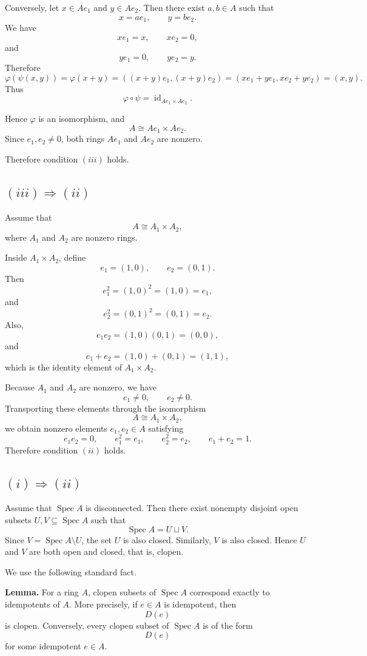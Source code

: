 \documentclass[12pt,a4paper]{article}
\newcommand{\Spec}{\operatorname{Spec}}
\begin{document}
	Conversely, let \(x\in Ae_1\) and \(y\in Ae_2\). Then there exist \(a,b\in A\)
	such that
	\[
	x=ae_1,
	\qquad
	y=be_2.
	\]
	We have
	\[
	xe_1=x,
	\qquad
	xe_2=0,
	\]
	and
	\[
	ye_1=0,
	\qquad
	ye_2=y.
	\]
	Therefore
	\[
	\varphi(\psi(x,y))
	=
	\varphi(x+y)
	=
	((x+y)e_1,(x+y)e_2)
	=
	(xe_1+ye_1,xe_2+ye_2)
	=
	(x,y).
	\]
	Thus
	\[
	\varphi\circ\psi=\operatorname{id}_{Ae_1\times Ae_2}.
	\]
	
	Hence \(\varphi\) is an isomorphism, and
	\[
	A\cong Ae_1\times Ae_2.
	\]
	Since \(e_1,e_2\neq 0\), both rings \(Ae_1\) and \(Ae_2\) are nonzero.
	
	Therefore condition \((iii)\) holds.
	
	\subsection*{\((iii)\Rightarrow(ii)\)}
	
	Assume that
	\[
	A\cong A_1\times A_2,
	\]
	where \(A_1\) and \(A_2\) are nonzero rings.
	
	Inside \(A_1\times A_2\), define
	\[
	e_1=(1,0),
	\qquad
	e_2=(0,1).
	\]
	Then
	\[
	e_1^2=(1,0)^2=(1,0)=e_1,
	\]
	and
	\[
	e_2^2=(0,1)^2=(0,1)=e_2.
	\]
	Also,
	\[
	e_1e_2=(1,0)(0,1)=(0,0),
	\]
	and
	\[
	e_1+e_2=(1,0)+(0,1)=(1,1),
	\]
	which is the identity element of \(A_1\times A_2\).
	
	Because \(A_1\) and \(A_2\) are nonzero, we have
	\[
	e_1\neq 0,
	\qquad
	e_2\neq 0.
	\]
	Transporting these elements through the isomorphism
	\[
	A\cong A_1\times A_2,
	\]
	we obtain nonzero elements \(e_1,e_2\in A\) satisfying
	\[
	e_1e_2=0,
	\qquad
	e_1^2=e_1,
	\qquad
	e_2^2=e_2,
	\qquad
	e_1+e_2=1.
	\]
	Therefore condition \((ii)\) holds.
	
	\subsection*{\((i)\Rightarrow(ii)\)}
	
	Assume that \(\Spec A\) is disconnected. Then there exist nonempty disjoint open
	subsets \(U,V\subseteq \Spec A\) such that
	\[
	\Spec A=U\sqcup V.
	\]
	Since \(V=\Spec A\setminus U\), the set \(U\) is also closed. Similarly, \(V\) is
	also closed. Hence \(U\) and \(V\) are both open and closed, that is, clopen.
	
	We use the following standard fact.
	
	\medskip
	
	\noindent
	\textbf{Lemma.}
	For a ring \(A\), clopen subsets of \(\Spec A\) correspond exactly to
	idempotents of \(A\). More precisely, if \(e\in A\) is idempotent, then
	\[
	D(e)
	\]
	is clopen. Conversely, every clopen subset of \(\Spec A\) is of the form
	\[
	D(e)
	\]
	for some idempotent \(e\in A\).
	
\end{document}
